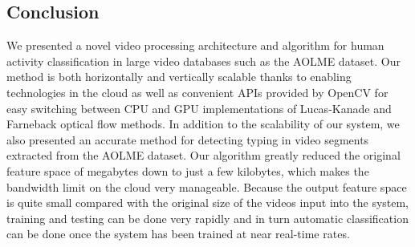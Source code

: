 \subsection{Conclusion}
We presented a novel video processing architecture and algorithm for human
activity classification in large video databases such as the AOLME dataset. Our
method is both horizontally and vertically scalable thanks to enabling
technologies in the cloud as well as convenient APIs provided by OpenCV for easy
switching between CPU and GPU implementations of Lucas-Kanade and Farneback
optical flow methods. In addition to the scalability of our system, we also
presented an accurate method for detecting typing in video segments extracted
from the AOLME dataset. Our algorithm greatly reduced the original feature space
of megabytes down to just a few kilobytes, which makes the bandwidth limit on
the cloud very manageable. Because the output feature space is quite small
compared with the original size of the videos input into the system, training
and testing can be done very rapidly and in turn automatic classification can be
done once the system has been trained at near real-time rates.
